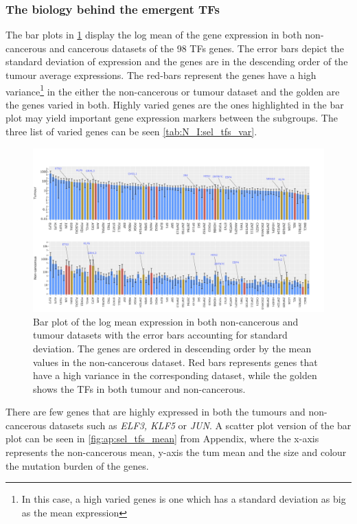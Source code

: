 \subsubsection{The biology behind the emergent TFs} \label{s:N_I:sel_tfs_bio}

The bar plots in \cref{fig:N_I:sel_tfs_var} display the log mean of the gene expression in both non-cancerous and cancerous datasets of the 98 TFs genes. The error bars depict the standard deviation of expression and the genes are in the descending order of the tumour average expressions. The red-bars represent the genes have a high variance\footnote{In this case, a high varied genes is one which has a standard deviation as big as the mean expression} in the either the non-cancerous or tumour dataset and the golden are the genes varied in both. Highly varied genes are the ones highlighted in the bar plot may yield important gene expression markers between the subgroups. The three list of varied genes can be seen \cref{tab:N_I:sel_tfs_var}.

\begin{figure}[!htb]   
\centering
\includegraphics[width=1.0\textwidth,height=1.0\textheight,keepaspectratio]{Sections/Network_I/Resources/selective_pruning/sel_tfs_var_tum_healthy.png}
  \caption{Bar plot of the log mean expression in both non-cancerous and tumour datasets with the error bars accounting for standard deviation. The genes are ordered in descending order by the mean values in the non-cancerous dataset. Red bars represents genes that have a high variance in the corresponding dataset, while the golden shows the TFs in both tumour and non-cancerous.}
\label{fig:N_I:sel_tfs_var}
\end{figure}

There are few genes that are highly expressed in both the tumours and non-cancerous datasets such as \textit{ELF3, KLF5} or \textit{JUN}. A scatter plot version of the bar plot can be seen in \cref{fig:ap:sel_tfs_mean} from Appendix, where the x-axis represents the non-cancerous mean, y-axis the tum mean and the size and colour the mutation burden of the genes.

